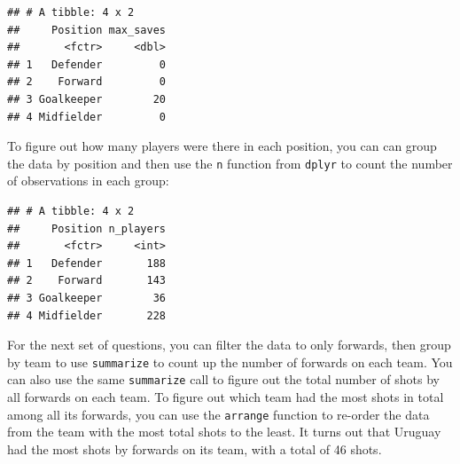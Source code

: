 \documentclass[]{book}
\makeatletter
\newenvironment{Shaded}{\begin{snugshade}}{\end{snugshade}}
\newcommand{\KeywordTok}[1]{\textcolor[rgb]{0.13,0.29,0.53}{\textbf{#1}}}
\newcommand{\DataTypeTok}[1]{\textcolor[rgb]{0.13,0.29,0.53}{#1}}
\newcommand{\StringTok}[1]{\textcolor[rgb]{0.31,0.60,0.02}{#1}}
\newcommand{\OperatorTok}[1]{\textcolor[rgb]{0.81,0.36,0.00}{\textbf{#1}}}
\newcommand{\NormalTok}[1]{#1}
\newenvironment{kframe}{%
\medskip{}
\setlength{\fboxsep}{.8em}
 \def\at@end@of@kframe{}%
 \ifinner\ifhmode%
  \def\at@end@of@kframe{\end{minipage}}%
  \begin{minipage}{\columnwidth}%
 \fi\fi%
 \def\FrameCommand##1{\hskip\@totalleftmargin \hskip-\fboxsep
 \colorbox{shadecolor}{##1}\hskip-\fboxsep
     \hskip-\linewidth \hskip-\@totalleftmargin \hskip\columnwidth}%
 \MakeFramed {\advance\hsize-\width
   \@totalleftmargin\z@ \linewidth\hsize
   \@setminipage}}%
 {\par\unskip\endMakeFramed%
 \at@end@of@kframe}
\renewenvironment{Shaded}{\begin{kframe}}{\end{kframe}}
\theoremstyle{definition}
\theoremstyle{definition}
\theoremstyle{definition}
\theoremstyle{remark}
\makeatother
\begin{document}
\begin{verbatim}
## # A tibble: 4 x 2
##     Position max_saves
##       <fctr>     <dbl>
## 1   Defender         0
## 2    Forward         0
## 3 Goalkeeper        20
## 4 Midfielder         0
\end{verbatim}

To figure out how many players were there in each position, you can can
group the data by position and then use the \texttt{n} function from
\texttt{dplyr} to count the number of observations in each group:

\begin{Shaded}
\end{Shaded}

\begin{verbatim}
## # A tibble: 4 x 2
##     Position n_players
##       <fctr>     <int>
## 1   Defender       188
## 2    Forward       143
## 3 Goalkeeper        36
## 4 Midfielder       228
\end{verbatim}

For the next set of questions, you can filter the data to only forwards,
then group by team to use \texttt{summarize} to count up the number of
forwards on each team. You can also use the same \texttt{summarize} call
to figure out the total number of shots by all forwards on each team. To
figure out which team had the most shots in total among all its
forwards, you can use the \texttt{arrange} function to re-order the data
from the team with the most total shots to the least. It turns out that
Uruguay had the most shots by forwards on its team, with a total of 46
shots.

\begin{Shaded}
\end{Shaded}
\end{document}
